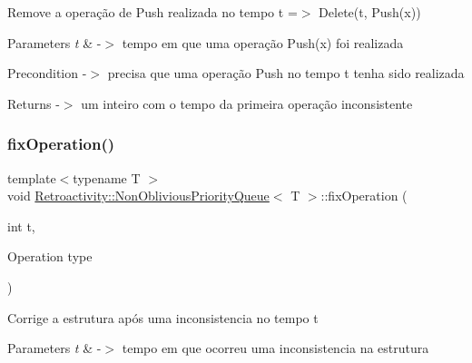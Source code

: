 Remove a operação de Push realizada no tempo t =$>$ Delete(t, Push(x))


\begin{DoxyParams}{Parameters}
{\em t} & -\/$>$ tempo em que uma operação Push(x) foi realizada \\
\hline
\end{DoxyParams}
\begin{DoxyPrecond}{Precondition}
-\/$>$ precisa que uma operação Push no tempo t tenha sido realizada 
\end{DoxyPrecond}
\begin{DoxyReturn}{Returns}
-\/$>$ um inteiro com o tempo da primeira operação inconsistente 
\end{DoxyReturn}
\mbox{\label{classRetroactivity_1_1NonObliviousPriorityQueue_aea039a8fc820950319380b900f2f2099}} 
\subsubsection{\texorpdfstring{fix\+Operation()}{fixOperation()}}
{\footnotesize\ttfamily template$<$typename T $>$ \\
void \hyperlink{classRetroactivity_1_1NonObliviousPriorityQueue}{Retroactivity\+::\+Non\+Oblivious\+Priority\+Queue}$<$ T $>$\+::fix\+Operation (\begin{DoxyParamCaption}\item[{int}]{t,  }\item[{Operation}]{type }\end{DoxyParamCaption})}

Corrige a estrutura após uma inconsistencia no tempo t


\begin{DoxyParams}{Parameters}
{\em t} & -\/$>$ tempo em que ocorreu uma inconsistencia na estrutura \\
\hline
\end{DoxyParams}
\mbox{\label{classRetroactivity_1_1NonObliviousPriorityQueue_a2d45d481f3eec3d668ce48f8b3e7d5c3}} 
